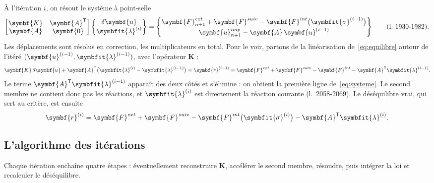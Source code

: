 \documentclass[11pt,a4paper]{article}
\numberwithin{equation}{section}
\newcommand{\lig}[1]{l.~#1}
\newcommand{\vc}[1]{\symbf{#1}}                         %
\newcommand{\sig}{\symbfit{\sigma}}
\newcommand{\vg}[1]{\symbfit{#1}}                       %
\begin{document}
À l'itération $i$, on résout le système à point-selle
\begin{equation}
\label{eq:systeme}
\begin{bmatrix}\vc K & \vc A^{\mathsf T}\\ \vc A & \vc 0\end{bmatrix}
\begin{Bmatrix}\delta\vc u\\ \vg\lambda^{(i)}\end{Bmatrix}
=
\begin{Bmatrix}\vc F^{ext}_{n+1} + \vc F^{suiv} - \vc F^{int}\big(\sig^{(i-1)}\big)\\[2pt] \vc u^{imp}_{n+1} - \vc A\,\vc u^{(i-1)}\end{Bmatrix}
\qquad(\text{\lig{1930-1982}}).
\end{equation}
Les déplacements sont résolus en correction, les multiplicateurs en total.
Pour le voir, partons de la linéarisation de~\eqref{eq:equilibre} autour de l'itéré $(\vc u^{(i-1)}, \vg\lambda^{(i-1)})$, avec l'opérateur $\vc K$ :
\begin{equation}
\vc K\,\delta\vc u + \vc A^{\mathsf T}\big(\vg\lambda^{(i)} - \vg\lambda^{(i-1)}\big) = \vc r^{(i-1)} = \vc F^{ext} + \vc F^{suiv} - \vc F^{int} - \vc A^{\mathsf T}\vg\lambda^{(i-1)} .
\end{equation}
Le terme $\vc A^{\mathsf T}\vg\lambda^{(i-1)}$ apparaît des deux côtés et s'élimine : on obtient la première ligne de~\eqref{eq:systeme}.
Le second membre ne contient donc pas les réactions, et $\vg\lambda^{(i)}$ est directement la réaction courante (\lig{2058-2069}).
Le déséquilibre vrai, qui sert au critère, est ensuite
\begin{equation}
\vc r^{(i)} = \vc F^{ext} + \vc F^{suiv} - \vc F^{int}\big(\sig^{(i)}\big) - \vc A^{\mathsf T}\vg\lambda^{(i)} .
\end{equation}

\subsection{L'algorithme des itérations}

Chaque itération enchaîne quatre étapes : éventuellement reconstruire $\vc K$, accélérer le second membre, résoudre, puis intégrer la loi et recalculer le déséquilibre.
\end{document}
